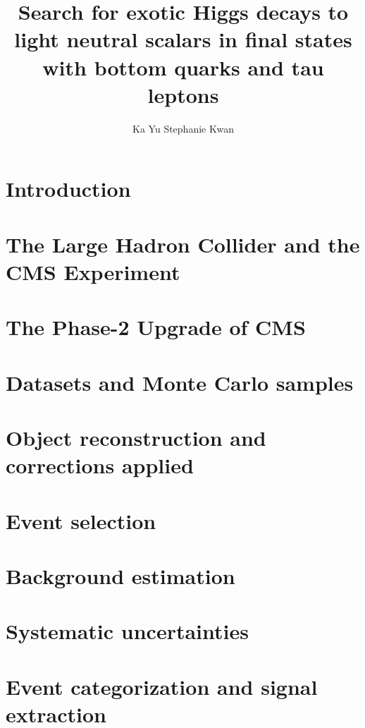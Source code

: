 \documentclass[12pt,lot,lof]{puthesis}
\title{Search for exotic Higgs decays to light neutral scalars in final states with bottom quarks and tau leptons}
\author{Ka Yu Stephanie Kwan}
\begin{document}
 
\chapter{Introduction}


\chapter{The Large Hadron Collider and the CMS Experiment}


\chapter{The Phase-2 Upgrade of CMS}
\label{chapter:ch-3:phase-2-upgrade-cms} 


\chapter{Datasets and Monte Carlo samples}


\chapter{Object reconstruction and corrections applied}


\chapter{Event selection}


\chapter{Background estimation}
\label{chapter:ch-7:background-estimation}


\chapter{Systematic uncertainties}
\label{chapter:ch-8:systematic-uncertainties}


\chapter{Event categorization and signal extraction}
\label{chapter:ch-9:event-categorization-signal-extraction}

\end{document}
